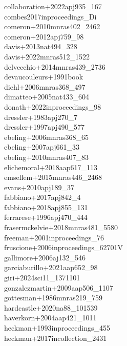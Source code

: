 \documentclass{article}
\begin{document}
\noindent collaboration+2022apj935_167 \\
\noindent combes2017inproceedings_Di \\
\noindent comeron+2010mnras402_2462 \\
\noindent comeron+2012apj759_98 \\
\noindent davis+2013nat494_328 \\
\noindent davis+2022mnras512_1522 \\
\noindent delvecchio+2014mnras439_2736 \\
\noindent devaucouleurs+1991book \\
\noindent diehl+2006mnras368_497 \\
\noindent dimatteo+2005nat433_604 \\
\noindent donath+2022inproceedings_98 \\
\noindent dressler+1983apj270_7 \\
\noindent dressler+1997apj490_577 \\
\noindent ebeling+2006mnras368_65 \\
\noindent ebeling+2007apj661_33 \\
\noindent ebeling+2010mnras407_83 \\
\noindent elichemoral+2018aap617_113 \\
\noindent emsellem+2015mnras446_2468 \\
\noindent evans+2010apj189_37 \\
\noindent fabbiano+2017apj842_4 \\
\noindent fabbiano+2018apj855_131 \\
\noindent ferrarese+1996apj470_444 \\
\noindent frasermckelvie+2018mnras481_5580 \\
\noindent freeman+2001inproceedings_76 \\
\noindent fruscione+2006inproceedings_62701V \\
\noindent gallimore+2006aj132_546 \\
\noindent garciaburillo+2021aap652_98 \\
\noindent giri+2024sci11_1371101 \\
\noindent gonzalezmartin+2009aap506_1107 \\
\noindent gottesman+1986mnras219_759 \\
\noindent hardcastle+2020na88_101539 \\
\noindent haverkorn+2004aap421_1011 \\
\noindent heckman+1993inproceedings_455 \\
\noindent heckman+2017incollection_2431 \\
\end{document}
